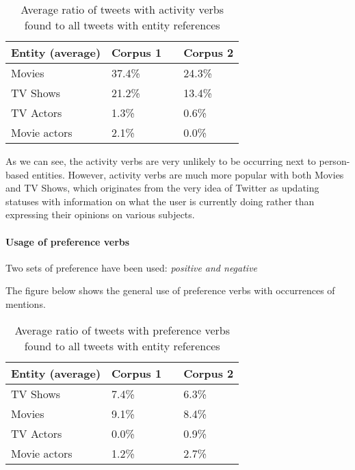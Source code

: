 \begin{center}
  \begin{table}[h!b!p!]
    \begin{tabular}{ | p{4cm} | p{2cm} | p{1cm}| p{2cm} | } \hline
      Entity (average) & Corpus 1 & & Corpus 2 \\ \hline
      Movies & 37.4\% & & 24.3\% \\ \hline
      TV Shows & 21.2\% & & 13.4\% \\ \hline
      TV Actors & 1.3\% & & 0.6\% \\ \hline
      Movie actors & 2.1\% & & 0.0\% \\ \hline
    \end{tabular}
    \caption{Average ratio of tweets with activity verbs found to all tweets with entity references}
  \end{table}
\end{center}

As we can see, the activity verbs are very unlikely to be occurring next to
person-based entities. However, activity verbs are much more popular with both
Movies and TV Shows, which originates from the very idea of Twitter as
updating statuses with information on what the user is currently doing rather
than expressing their opinions on various subjects.

\paragraph{Usage of preference verbs}
Two sets of preference have been used: \textit{positive and negative}

The figure below shows the general use of preference verbs with occurrences of
mentions.

\begin{center}
  \begin{table}[h!b!p!]
    \begin{tabular}{ | p{4cm} | p{2cm} | p{1cm}| p{2cm} | } \hline
      Entity (average) & Corpus 1 & & Corpus 2 \\ \hline
      TV Shows & 7.4\% & & 6.3\% \\ \hline
      Movies & 9.1\% & & 8.4\% \\ \hline
      TV Actors & 0.0\% & & 0.9\% \\ \hline
      Movie actors & 1.2\% & & 2.7\% \\ \hline
    \end{tabular}
    \caption{Average ratio of tweets with preference verbs found to all tweets with entity references}
  \end{table}
\end{center}

